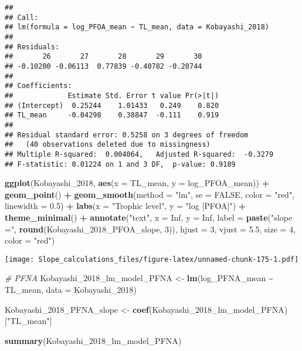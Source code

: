 \documentclass[
]{article}
\newenvironment{Shaded}{\begin{snugshade}}{\end{snugshade}}
\newcommand{\AttributeTok}[1]{\textcolor[rgb]{0.13,0.29,0.53}{#1}}
\newcommand{\CommentTok}[1]{\textcolor[rgb]{0.56,0.35,0.01}{\textit{#1}}}
\newcommand{\ConstantTok}[1]{\textcolor[rgb]{0.56,0.35,0.01}{#1}}
\newcommand{\DecValTok}[1]{\textcolor[rgb]{0.00,0.00,0.81}{#1}}
\newcommand{\FloatTok}[1]{\textcolor[rgb]{0.00,0.00,0.81}{#1}}
\newcommand{\FunctionTok}[1]{\textcolor[rgb]{0.13,0.29,0.53}{\textbf{#1}}}
\newcommand{\NormalTok}[1]{#1}
\newcommand{\OtherTok}[1]{\textcolor[rgb]{0.56,0.35,0.01}{#1}}
\newcommand{\SpecialCharTok}[1]{\textcolor[rgb]{0.81,0.36,0.00}{\textbf{#1}}}
\newcommand{\StringTok}[1]{\textcolor[rgb]{0.31,0.60,0.02}{#1}}
\begin{document}
\begin{verbatim}
## 
## Call:
## lm(formula = log_PFOA_mean ~ TL_mean, data = Kobayashi_2018)
## 
## Residuals:
##       26       27       28       29       30 
## -0.10200 -0.06113  0.77839 -0.40782 -0.20744 
## 
## Coefficients:
##             Estimate Std. Error t value Pr(>|t|)
## (Intercept)  0.25244    1.01433   0.249    0.820
## TL_mean     -0.04298    0.38847  -0.111    0.919
## 
## Residual standard error: 0.5258 on 3 degrees of freedom
##   (40 observations deleted due to missingness)
## Multiple R-squared:  0.004064,   Adjusted R-squared:  -0.3279 
## F-statistic: 0.01224 on 1 and 3 DF,  p-value: 0.9189
\end{verbatim}

\begin{Shaded}
\begin{Highlighting}[]
\FunctionTok{ggplot}\NormalTok{(Kobayashi\_2018, }\FunctionTok{aes}\NormalTok{(}\AttributeTok{x =}\NormalTok{ TL\_mean, }\AttributeTok{y =}\NormalTok{ log\_PFOA\_mean)) }\SpecialCharTok{+}
  \FunctionTok{geom\_point}\NormalTok{() }\SpecialCharTok{+}
  \FunctionTok{geom\_smooth}\NormalTok{(}\AttributeTok{method =} \StringTok{"lm"}\NormalTok{, }\AttributeTok{se =} \ConstantTok{FALSE}\NormalTok{, }\AttributeTok{color =} \StringTok{"red"}\NormalTok{, }\AttributeTok{linewidth =} \FloatTok{0.5}\NormalTok{) }\SpecialCharTok{+}
  \FunctionTok{labs}\NormalTok{(}\AttributeTok{x =} \StringTok{"Trophic level"}\NormalTok{,}
       \AttributeTok{y =} \StringTok{"log [PFOA]"}\NormalTok{) }\SpecialCharTok{+}
  \FunctionTok{theme\_minimal}\NormalTok{() }\SpecialCharTok{+}
  \FunctionTok{annotate}\NormalTok{(}\StringTok{"text"}\NormalTok{, }\AttributeTok{x =} \ConstantTok{Inf}\NormalTok{, }\AttributeTok{y =} \ConstantTok{Inf}\NormalTok{, }\AttributeTok{label =} \FunctionTok{paste}\NormalTok{(}\StringTok{"slope ="}\NormalTok{, }\FunctionTok{round}\NormalTok{(Kobayashi\_2018\_PFOA\_slope, }\DecValTok{3}\NormalTok{)), }
           \AttributeTok{hjust =} \DecValTok{3}\NormalTok{, }\AttributeTok{vjust =} \FloatTok{5.5}\NormalTok{, }\AttributeTok{size =} \DecValTok{4}\NormalTok{, }\AttributeTok{color =} \StringTok{"red"}\NormalTok{)}
\end{Highlighting}
\end{Shaded}

\texttt{[image: Slope\_calculations\_files/figure-latex/unnamed-chunk-175-1.pdf]}

\begin{Shaded}
\begin{Highlighting}[]
\CommentTok{\# PFNA}
\NormalTok{Kobayashi\_2018\_lm\_model\_PFNA }\OtherTok{\textless{}{-}} \FunctionTok{lm}\NormalTok{(log\_PFNA\_mean }\SpecialCharTok{\textasciitilde{}}\NormalTok{ TL\_mean,}
                                    \AttributeTok{data =}\NormalTok{ Kobayashi\_2018)}

\NormalTok{Kobayashi\_2018\_PFNA\_slope }\OtherTok{\textless{}{-}} \FunctionTok{coef}\NormalTok{(Kobayashi\_2018\_lm\_model\_PFNA)[}\StringTok{"TL\_mean"}\NormalTok{]}

\FunctionTok{summary}\NormalTok{(Kobayashi\_2018\_lm\_model\_PFNA)}
\end{Highlighting}
\end{Shaded}
\end{document}
